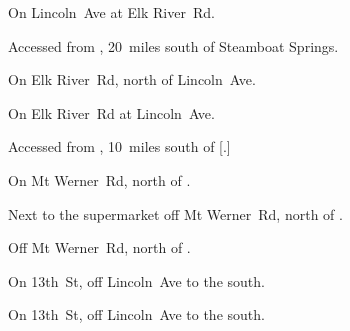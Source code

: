 
\begin{LocationList}

On  Lincoln~Ave at Elk River~Rd.

Accessed from , 20~miles south of Steamboat Springs.

\Location{\GarageHQ \Garage}
On Elk River~Rd, north of  Lincoln~Ave.

\Location{\GasStation \Gas}
On Elk River~Rd at  Lincoln~Ave.

Accessed from , 10~miles south of [.]

On Mt Werner~Rd, north of .

\Location{\RestArea \Rest}
Next to the supermarket off Mt Werner~Rd, north of .

Off Mt Werner~Rd, north of .

\Location{\TruckService \Service}
On 13th~St, off  Lincoln~Ave to the south.

On 13th~St, off  Lincoln~Ave to the south.

\end{LocationList}
